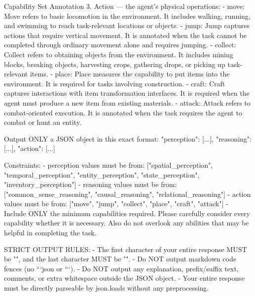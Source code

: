 \documentclass[11pt]{article}
\begin{document}
\begin{center}
\begin{widepromptbox}{Capability Set Annotation}
3. Action — the agent's physical operations:
   - move: Move refers to basic locomotion in the environment. It includes walking, running, and swimming to reach task-relevant locations or objects.
   - jump: Jump captures actions that require vertical movement. It is annotated when the task cannot be completed through ordinary movement alone and requires jumping.
   - collect: Collect refers to obtaining objects from the environment. It includes mining blocks, breaking objects, harvesting crops, gathering drops, or picking up task-relevant items.
   - place: Place measures the capability to put items into the environment. It is required for tasks involving construction.
   - craft: Craft captures interactions with item transformation interfaces. It is required when the agent must produce a new item from existing materials.
   - attack: Attack refers to combat-oriented execution. It is annotated when the task requires the agent to combat or hunt an entity.

Output ONLY a JSON object in this exact format:
{"perception": [...], "reasoning": [...], "action": [...]}

Constraints:
- perception values must be from: ["spatial_perception", "temporal_perception", "entity_perception", "state_perception", "inventory_perception"]
- reasoning values must be from: ["common_sense_reasoning", "causal_reasoning", "relational_reasoning"]
- action values must be from: ["move", "jump", "collect", "place", "craft", "attack"]
- Include ONLY the minimum capabilities required. Please carefully consider every capability whether it is necessary. Also do not overlook any abilities that may be helpful in completing the task.

STRICT OUTPUT RULES:
- The first character of your entire response MUST be "{", and the last character MUST be "}".
- Do NOT output markdown code fences (no ```json or ```).
- Do NOT output any explanation, prefix/suffix text, comments, or extra whitespace outside the JSON object.
- Your entire response must be directly parseable by json.loads without any preprocessing.
\end{widepromptbox}    
\end{center}
\end{document}
